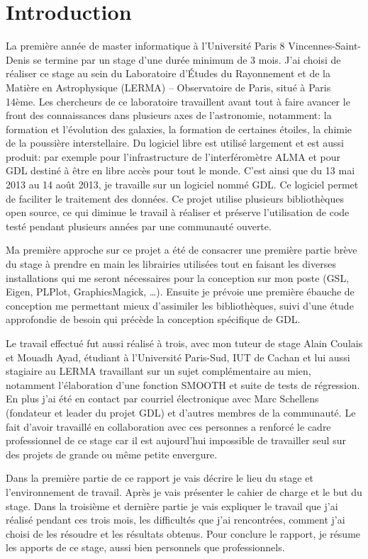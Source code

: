 \section*{Introduction} %
  
La première année de master informatique à l’Université Paris 8 Vincennes-Saint-Denis se termine par un stage d’une durée minimum de 3 mois.
J'ai choisi de réaliser ce stage au sein du Laboratoire d’Études du Rayonnement et de la Matière en Astrophysique (LERMA) – Observatoire de Paris, situé à Paris 14ème. Les chercheurs de ce laboratoire travaillent avant tout à faire avancer le front des connaissances dans plusieurs axes de l'astronomie, notamment: la formation et l’évolution des galaxies, la formation de certaines étoiles, la chimie de la poussière interstellaire. Du logiciel libre est utilisé largement et est aussi produit: par exemple pour l'infrastructure de l'interféromètre ALMA et pour GDL destiné à être en libre accès pour tout le monde.
C’est ainsi que du 13 mai 2013 au 14 août 2013, je travaille sur un logiciel nommé GDL. Ce logiciel permet de faciliter le traitement des données. Ce projet utilise plusieurs bibliothèques open source, ce qui diminue le travail à réaliser et préserve l’utilisation de code testé pendant plusieurs années par une communauté ouverte.


Ma première approche sur ce projet a été de consacrer une première partie brève du stage à prendre en main les librairies utilisées tout en faisant les diverses installations qui me seront nécessaires pour la conception sur mon poste (GSL, Eigen, PLPlot, GraphicsMagick, …). Ensuite je prévoie une première ébauche de conception  me permettant mieux d’assimiler les bibliothèques, suivi d’une étude approfondie de besoin qui précède la conception spécifique de GDL.

Le travail effectué fut aussi réalisé à trois, avec mon tuteur de stage Alain Coulais et Mouadh Ayad, étudiant à l'Université Paris-Sud, IUT de Cachan et lui aussi stagiaire au LERMA travaillant sur un sujet complémentaire au mien, notamment l'élaboration d’une fonction SMOOTH et suite de tests de régression. En plus j'ai été en contact par courriel électronique avec Marc Schellens (fondateur et leader du projet GDL) et d'autres membres de la communauté. Le fait d’avoir travaillé en collaboration avec ces personnes a renforcé le cadre professionnel de ce stage car il est aujourd’hui impossible de travailler seul sur des projets de grande ou même petite envergure.


Dans la première partie de ce rapport je vais décrire le lieu du stage et l’environnement de travail. Après je vais présenter le cahier de charge et le but du stage. Dans la troisième et dernière partie je vais expliquer le travail que j’ai réalisé pendant ces trois mois, les difficultés que j’ai rencontrées, comment j’ai choisi de les résoudre et les résultats obtenus. Pour conclure le rapport, je résume les apports de ce stage, aussi bien personnels que professionnels.